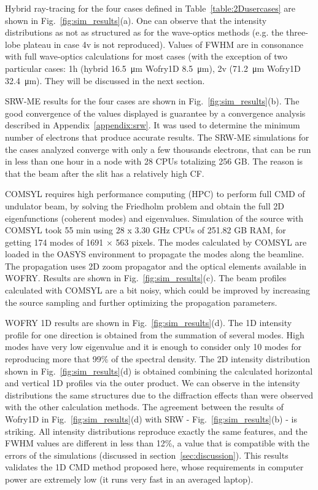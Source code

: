 \documentclass{iucr}              %
\begin{document}
Hybrid ray-tracing for the four cases defined in Table~\ref{table:2Dusercases} are shown in  Fig.~\ref{fig:sim_results}(a). One can observe that the intensity distributions as not as structured as for the wave-optics methods (e.g. the three-lobe plateau in case 4v is not reproduced). Values of FWHM are in consonance with full wave-optics calculations for most cases (with the exception of two particular cases:
1h (hybrid \SI{16.5}{\micro\meter} Wofry1D \SI{8.5}{\micro\meter}),
2v (\SI{71.2}{\micro\meter} Wofry1D \SI{32.4}{\micro\meter}). They will be discussed in the next section.


SRW-ME results for the four cases are shown in Fig.~\ref{fig:sim_results}(b). The good convergence of the values displayed is guarantee by a convergence analysis described in Appendix~\ref{appendix:srw}.
It was used to determine the minimum number of electrons that produce accurate results. The SRW-ME simulations for the cases analyzed converge with only a few thousands electrons, that can be run in less than one hour in a node with 28 CPUs totalizing 256 GB. The reason is that the beam after the slit has a relatively high CF. 


COMSYL requires high performance computing (HPC) to perform full CMD of undulator beam, by
solving the Friedholm problem and obtain the full 2D eigenfunctions (coherent modes) and eigenvalues.
Simulation of the source with COMSYL took 55 min using 28 x 3.30 GHz CPUs of 251.82 GB RAM, for getting 174 modes of 1691 $\times$ 563 pixels.
The modes calculated by COMSYL are loaded in the OASYS environment \cite{codeOASYS} to propagate the modes along the beamline.
The propagation uses 2D zoom propagator and the optical elements available in WOFRY. Results are shown in Fig.~\ref{fig:sim_results}(c). 
The beam profiles calculated with COMSYL are a bit noisy, which could be improved by increasing the source sampling and further optimizing the propagation parameters. 


WOFRY 1D results are shown in Fig.~\ref{fig:sim_results}(d). The 1D intensity profile for one direction is obtained from the summation of several modes. High modes have very low eigenvalue and it is enough to consider only 10 modes for reproducing more that 99\% of the spectral density. The 2D intensity distribution shown in Fig.~\ref{fig:sim_results}(d) is obtained combining the calculated horizontal and vertical 1D profiles via the outer product. We can observe in the intensity distributions the same structures due to the diffraction effects than were observed with the other calculation methods. 
The agreement between the results of Wofry1D in Fig.~\ref{fig:sim_results}(d) with SRW - Fig.~\ref{fig:sim_results}(b) - is striking. All intensity distributions reproduce exactly the same features, and the FWHM values are different in less than 12\%, a value that is compatible with the errors of the simulations (discussed in section~\ref{sec:discussion}). This results validates the 1D CMD method proposed here, whose requirements in computer power are extremely low (it runs very fast in an averaged laptop).  
\end{document}
